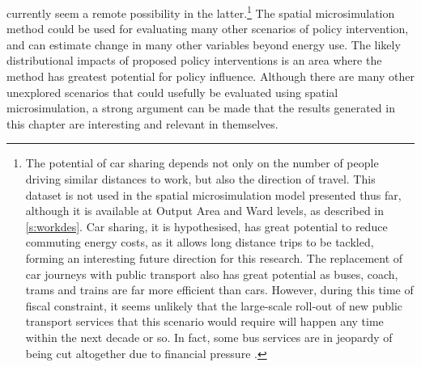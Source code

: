 \documentclass[a4paper, 11pt, twoside]{Thesis}
\begin{document}
currently seem a remote possibility in the 
latter.\footnote{The
potential of car sharing depends
not only on the number of people driving similar distances to work, but also the
direction of travel. This dataset is not used in the spatial microsimulation model
presented thus far, although it is available at Output Area and Ward levels,
as described in \cref{s:workdes}. Car sharing, it is hypothesised, has great
potential to reduce commuting energy costs, as it allows long distance trips
to be tackled, forming an interesting future direction for this research.
The replacement of car journeys with public transport also has great potential
as buses, coach, trams and trains are far more efficient than cars. However,
during this time of fiscal constraint, it seems unlikely that the large-scale
roll-out of new public transport services that this scenario would require
will happen any time within the next decade or so. In fact, some bus services
are in jeopardy of being cut altogether due to financial pressure \citep{Owen2012}.
}
The spatial microsimulation method could be used for evaluating many other
scenarios of policy intervention, and can estimate change in many other variables
beyond energy use. The likely distributional impacts of proposed policy interventions
is an area where the method has greatest potential for policy influence.
Although there are many other unexplored scenarios that could usefully be
evaluated using spatial microsimulation, a strong argument can be made that
the results generated in this chapter are interesting and relevant in themselves.
\end{document}
